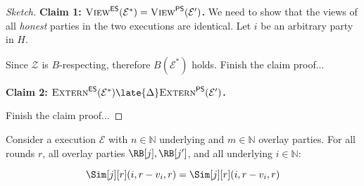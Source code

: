 \begin{proof}[Sketch]
  \noindent
  \textbf{Claim 1: $\textsc{View}^{\textsf{ES}}(\mathcal{E}^*) = \textsc{View}^{\textsf{PS}}(\mathcal{E}')$.} We need to show
  that the views of all \emph{honest} parties in the two executions are identical. Let
  $i$ be an arbitrary party in $H$.

  Since $\mathcal{Z}$ is $B$-respecting, therefore $B(\mathcal{E}^*)$ holds.
  {\color{red} Finish the claim proof...}

  \noindent
  \textbf{Claim 2: $\LCExtern(\mathcal{E}^*) \late{\Delta} \PEExtern(\mathcal{E}')$.}

  {\color{red} Finish the claim proof...}
\end{proof}

\begin{conjecture}\label{conj:cross-party}
  Consider a \rollerblade execution $\mathcal{E}$ with $n \in \mathbb{N}$ underlying
  and $m \in \mathbb{N}$ overlay parties.
  For all rounds $r$, all overlay parties $\RB[j], \RB[j']$,
  and all underlying $i \in \mathbb{N}$:

  \[
    \Sim[j][r](i, r - v_i, r) = \Sim[j][r](i, r - v_i, r)
  \]
\end{conjecture}

